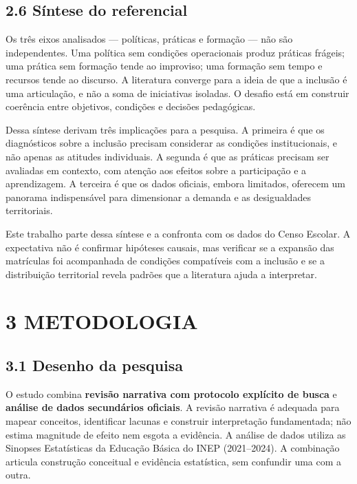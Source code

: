 \subsection{2.6 Síntese do referencial}\label{suxedntese-do-referencial}

Os três eixos analisados --- políticas, práticas e formação --- não são
independentes. Uma política sem condições operacionais produz práticas
frágeis; uma prática sem formação tende ao improviso; uma formação sem
tempo e recursos tende ao discurso. A literatura converge para a ideia
de que a inclusão é uma articulação, e não a soma de iniciativas
isoladas. O desafio está em construir coerência entre objetivos,
condições e decisões pedagógicas.

Dessa síntese derivam três implicações para a pesquisa. A primeira é que
os diagnósticos sobre a inclusão precisam considerar as condições
institucionais, e não apenas as atitudes individuais. A segunda é que as
práticas precisam ser avaliadas em contexto, com atenção aos efeitos
sobre a participação e a aprendizagem. A terceira é que os dados
oficiais, embora limitados, oferecem um panorama indispensável para
dimensionar a demanda e as desigualdades territoriais.

Este trabalho parte dessa síntese e a confronta com os dados do Censo
Escolar. A expectativa não é confirmar hipóteses causais, mas verificar
se a expansão das matrículas foi acompanhada de condições compatíveis
com a inclusão e se a distribuição territorial revela padrões que a
literatura ajuda a interpretar.

\section{3 METODOLOGIA}\label{metodologia}

\subsection{3.1 Desenho da pesquisa}\label{desenho-da-pesquisa}

O estudo combina \textbf{revisão narrativa com protocolo explícito de
busca} e \textbf{análise de dados secundários oficiais}. A revisão
narrativa é adequada para mapear conceitos, identificar lacunas e
construir interpretação fundamentada; não estima magnitude de efeito nem
esgota a evidência. A análise de dados utiliza as Sinopses Estatísticas
da Educação Básica do INEP (2021--2024). A combinação articula
construção conceitual e evidência estatística, sem confundir uma com a
outra.

